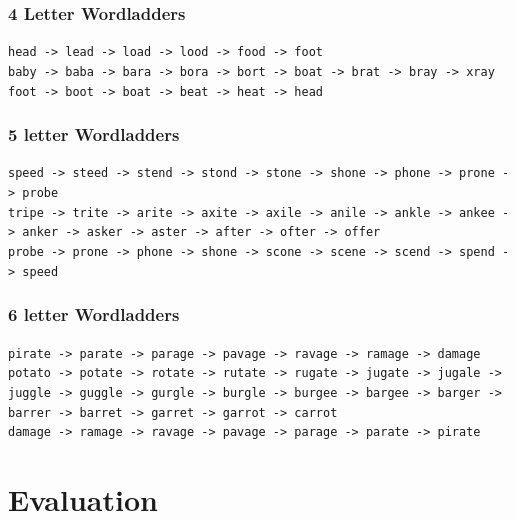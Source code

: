 \documentclass[10pt, a4paper]{article}
\begin{document}
\subsubsection{4 Letter Wordladders}
\hspace*{0.15in}
\texttt{head -> lead -> load -> lood -> food -> foot}\\

\texttt{baby -> baba -> bara -> bora -> bort -> boat -> brat -> bray -> xray}\\

\texttt{foot -> boot -> boat -> beat -> heat -> head}\\

\subsubsection{5 letter Wordladders}
\hspace*{0.15in}
\texttt{speed -> steed -> stend -> stond -> stone -> shone -> phone -> prone -> probe}\\

\texttt{tripe -> trite -> arite -> axite -> axile -> anile -> ankle -> ankee -> anker -> asker -> aster -> after -> ofter -> offer}\\

\texttt{probe -> prone -> phone -> shone -> scone -> scene -> scend -> spend -> speed}\\


\subsubsection{6 letter Wordladders}	
\hspace*{0.15in}
\texttt{pirate -> parate -> parage -> pavage -> ravage -> ramage -> damage}\\

\texttt{potato -> potate -> rotate -> rutate -> rugate -> jugate -> jugale -> juggle -> guggle -> gurgle -> burgle -> burgee -> bargee -> barger -> barrer -> barret -> garret -> garrot -> carrot}\\

\texttt{damage -> ramage -> ravage -> pavage -> parage -> parate -> pirate}\\


\section{Evaluation}
\end{document}
